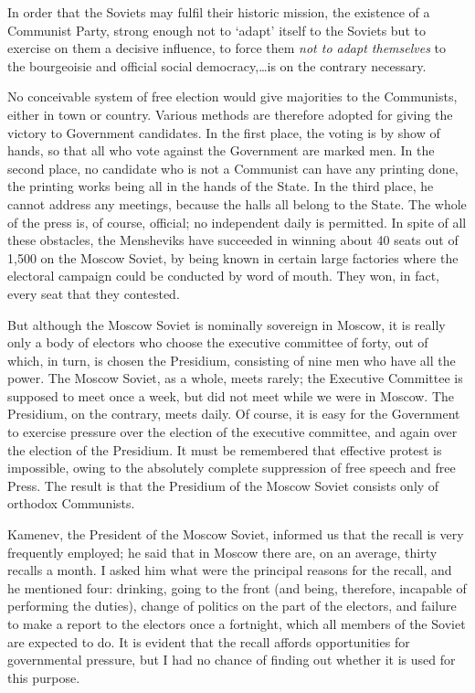 {\begin{displayquote}
In order that the Soviets may fulfil their historic mission, the existence of a Communist Party, strong enough not to `adapt' itself to the Soviets but to exercise on them a decisive influence, to force them \emph{not to adapt themselves} to the bourgeoisie and official social democracy,\ldots is on the contrary necessary.\end{displayquote}} No conceivable system of free election would give majorities to the Communists, either in town or country. Various methods are therefore adopted for giving the victory to Government candidates. In the first place, the voting is by show of hands, so that all who vote against the Government are marked men. In the second place, no candidate who is not a Communist can have any printing done, the printing works being all in the hands of the State. In the third place, he cannot address any meetings, because the halls all belong to the State. The whole of the press is, of course, official; no independent daily is permitted. In spite of all these obstacles, the Mensheviks have succeeded in winning about 40 seats out of 1,500 on the Moscow Soviet, by being known in certain large factories where the electoral campaign could be conducted by word of mouth. They won, in fact, every seat that they contested.

But although the Moscow Soviet is nominally sovereign in Moscow, it is really only a body of electors who choose the executive committee of forty, out of which, in turn, is chosen the Presidium, consisting of nine men who have all the power. The Moscow Soviet, as a whole, meets rarely; the Executive Committee is supposed to meet once a week, but did not meet while we were in Moscow. The Presidium, on the contrary, meets daily. Of course, it is easy for the Government to exercise pressure over the election of the executive committee, and again over the election of the Presidium. It must be remembered that effective protest is impossible, owing to the absolutely complete suppression of free speech and free Press. The result is that the Presidium of the Moscow Soviet consists only of orthodox Communists.

Kamenev, the President of the Moscow Soviet, informed us that the recall is very frequently employed; he said that in Moscow there are, on an average, thirty recalls a month. I asked him what were the principal reasons for the recall, and he mentioned four: drinking, going to the front (and being, therefore, incapable of performing the duties), change of politics on the part of the electors, and failure to make a report to the electors once a fortnight, which all members of the Soviet are expected to do. It is evident that the recall affords opportunities for governmental pressure, but I had no chance of finding out whether it is used for this purpose.

